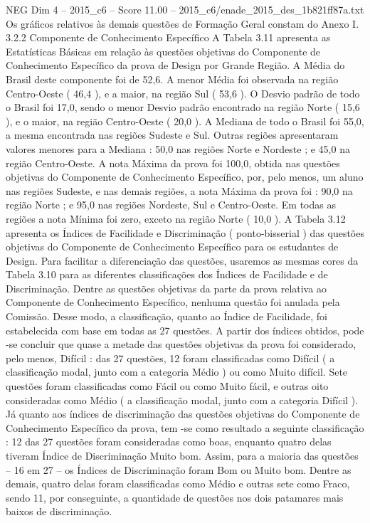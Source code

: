 \begin{textsample}{NEG Dim 4 – 2015\_c6 – Score 11.00 – 2015\_c6/enade\_2015\_des\_1b821ff87a.txt}
Os gráficos relativos às demais questões de Formação Geral constam do Anexo I. 3.2.2 Componente de Conhecimento Específico A Tabela 3.11 apresenta as Estatísticas Básicas em relação às questões objetivas do Componente de Conhecimento Específico da prova de Design por Grande Região.
A Média do Brasil deste componente foi de 52,6.
A menor Média foi observada na região Centro-Oeste ( 46,4 ), e a maior, na região Sul ( 53,6 ).
O Desvio padrão de todo o Brasil foi 17,0, sendo o menor Desvio padrão encontrado na região Norte ( 15,6 ), e o maior, na região Centro-Oeste ( 20,0 ).
A Mediana de todo o Brasil foi 55,0, a mesma encontrada nas regiões Sudeste e Sul.
Outras regiões apresentaram valores menores para a Mediana : 50,0 nas regiões Norte e Nordeste ; e 45,0 na região Centro-Oeste.
A nota Máxima da prova foi 100,0, obtida nas questões objetivas do Componente de Conhecimento Específico, por, pelo menos, um aluno nas regiões Sudeste, e nas demais regiões, a nota Máxima da prova foi : 90,0 na região Norte ; e 95,0 nas regiões Nordeste, Sul e Centro-Oeste.
Em todas as regiões a nota Mínima foi zero, exceto na região Norte ( 10,0 ).
A Tabela 3.12 apresenta os Índices de Facilidade e Discriminação ( ponto-bisserial ) das questões objetivas do Componente de Conhecimento Específico para os estudantes de Design.
Para facilitar a diferenciação das questões, usaremos as mesmas cores da Tabela 3.10 para as diferentes classificações dos Índices de Facilidade e de Discriminação.
Dentre as questões objetivas da parte da prova relativa ao Componente de Conhecimento Específico, nenhuma questão foi anulada pela Comissão.
Desse modo, a classificação, quanto ao Índice de Facilidade, foi estabelecida com base em todas as 27 questões.
A partir dos índices obtidos, pode -se concluir que quase a metade das questões objetivas da prova foi considerado, pelo menos, Difícil : das 27 questões, 12 foram classificadas como Difícil ( a classificação modal, junto com a categoria Médio ) ou como Muito difícil.
Sete questões foram classificadas como Fácil ou como Muito fácil, e outras oito consideradas como Médio ( a classificação modal, junto com a categoria Difícil ).
Já quanto aos índices de discriminação das questões objetivas do Componente de Conhecimento Específico da prova, tem -se como resultado a seguinte classificação : 12 das 27 questões foram consideradas como boas, enquanto quatro delas tiveram Índice de Discriminação Muito bom.
Assim, para a maioria das questões – 16 em 27 – os Índices de Discriminação foram Bom ou Muito bom.
Dentre as demais, quatro delas foram classificadas como Médio e outras sete como Fraco, sendo 11, por conseguinte, a quantidade de questões nos dois patamares mais baixos de discriminação.

\end{textsample}

